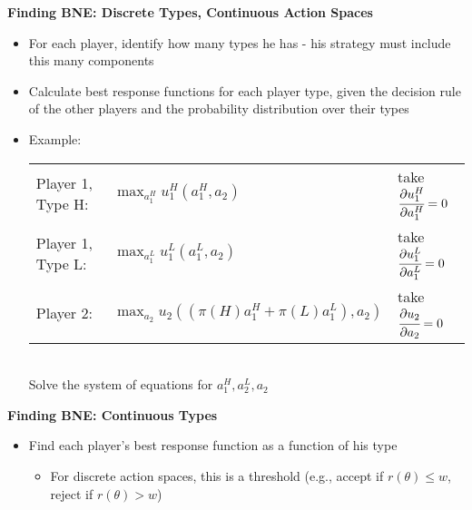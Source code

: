 \documentclass{report}
\newcommand{\FlowerSmall}{\mbox{\raisebox{-1pt}{\small\EightFlowerPetalRemoved}}} %
\begin{document}
\newpage
\begin{mdframed}
	\medskip
	\begin{center} \textbf{{\large Finding BNE: Discrete Types, Continuous Action Spaces}} \end{center}
	\begin{itemize}[label=\FlowerSmall]
		\item For each player, identify how many types he has - his strategy must include this many components
		\item Calculate best response functions for each player type, given the decision rule of the other players and the probability distribution over their types
		\item Example:\\
		\begin{tabular}[t]{@{} l l l}
			Player 1, Type H: & $\displaystyle\max_{a^H_1} u^H_1(a^H_1,a_2)$ & take $\cfrac{\partial u^H_1}{\partial a^H_1} = 0$\\[15pt]
			Player 1, Type L: & $\displaystyle\max_{a^L_1} u^L_1(a^L_1,a_2)$ & take $\cfrac{\partial u^L_1}{\partial a^L_1} = 0$\\[15pt]
			Player 2: & $\displaystyle\max_{a_2} u_2((\pi(H) a^H_1 + \pi(L) a^L_1),a_2)$ \hspace{10pt} & take $\cfrac{\partial u_2}{\partial a_2} = 0$\\[15pt]
		\end{tabular}\\
		Solve the system of equations for $a^H_1,a^L_2, a_2$
	\end{itemize}
	\smallskip
\end{mdframed}
\bigskip

\bigskip
\begin{mdframed}
	\medskip
	\begin{center} \textbf{{\large Finding BNE: Continuous Types}} \end{center}
	\begin{itemize}[label=\FlowerSmall]
		\item Find each player's best response function as a function of his type
			\begin{itemize}
				\item For discrete action spaces, this is a threshold (e.g., accept if $r(\theta) \leq w$, reject if $r(\theta) > w$)
			\end{itemize}
	\end{itemize}
	\smallskip
\end{mdframed}
\bigskip
\end{document}
